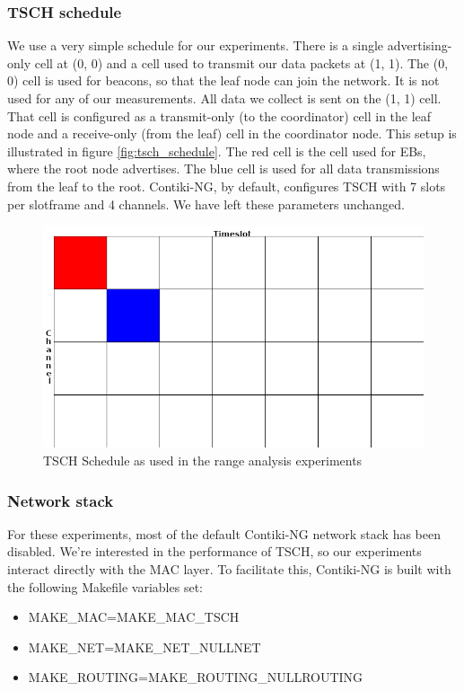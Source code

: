 \documentclass[conference]{IEEEtran}
\begin{document}
\subsubsection{TSCH schedule}
\label{section:tschschedule}

We use a very simple schedule for our experiments. There is a single advertising-only cell at (0, 0) and a cell used to transmit our data packets at (1, 1). The (0, 0) cell is used for beacons, so that the leaf node can join the network. It is not used for any of our measurements. All data we collect is sent on the (1, 1) cell. That cell is configured as a transmit-only (to the coordinator) cell in the leaf node and a receive-only (from the leaf) cell in the coordinator node. This setup is illustrated in figure \ref{fig:tsch_schedule}. The red cell is the cell used for EBs, where the root node advertises. The blue cell is used for all data transmissions from the leaf to the root. Contiki-NG, by default, configures TSCH with 7 slots per slotframe and 4 channels. We have left these parameters unchanged. 
\begin{figure}[]
	\centering
	\includegraphics[width=.4\textwidth,keepaspectratio]{tsch_schedule.png}
	\caption{TSCH Schedule as used in the range analysis experiments}
	\label{fig:6tischStack}
\end{figure}


\subsubsection{Network stack}
\label{section:netstack}

For these experiments, most of the default Contiki-NG network stack has been disabled. We're interested in the performance of TSCH, so our experiments interact directly with the MAC layer. To facilitate this, Contiki-NG is built with the following Makefile variables set: 

\begin{itemize}
\item MAKE\_MAC=MAKE\_MAC\_TSCH
\item MAKE\_NET=MAKE\_NET\_NULLNET
\item MAKE\_ROUTING=MAKE\_ROUTING\_NULLROUTING
\end{itemize}
\end{document}
